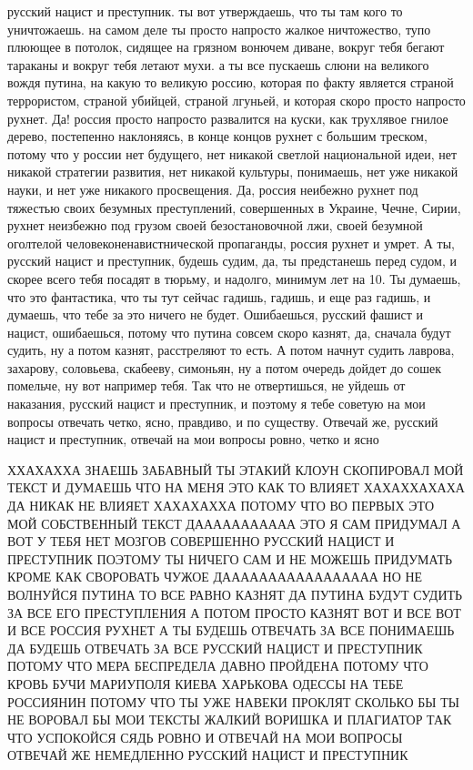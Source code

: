 русский нацист и преступник. ты вот утверждаешь, что ты там кого то
уничтожаешь.  на самом деле ты просто напросто жалкое ничтожество, тупо плюющее
в потолок, сидящее на грязном вонючем диване, вокруг тебя бегают тараканы и
вокруг тебя летают мухи.  а ты все пускаешь слюни на великого вождя путина, на
какую то великую россию, которая по факту является страной террористом, страной
убийцей, страной лгуньей, и которая скоро просто напросто рухнет. Да! россия
просто напросто развалится на куски, как трухлявое гнилое дерево, постепенно
наклоняясь, в конце концов рухнет с большим треском, потому что у россии нет
будущего, нет никакой светлой национальной идеи, нет никакой стратегии
развития, нет никакой культуры, понимаешь, нет уже никакой науки, и нет уже
никакого просвещения. Да, россия неибежно рухнет под тяжестью своих безумных
преступлений, совершенных в Украине, Чечне, Сирии, рухнет неизбежно под грузом
своей безостановочной лжи, своей безумной оголтелой человеконенавистнической
пропаганды, россия рухнет и умрет. А ты, русский нацист и преступник, будешь
судим, да, ты предстанешь перед судом, и скорее всего тебя посадят в тюрьму, и
надолго, минимум лет на 10. Ты думаешь, что это фантастика, что ты тут сейчас
гадишь, гадишь, и еще раз гадишь, и думаешь, что тебе за это ничего не будет.
Ошибаешься, русский фашист и нацист, ошибаешься, потому что путина совсем скоро
казнят, да, сначала будут судить, ну а потом казнят, расстреляют то есть. А
потом начнут судить лаврова, захарову, соловьева, скабееву, симоньян, ну а
потом очередь дойдет до сошек помельче, ну вот например тебя. Так что не
отвертишься, не уйдешь от наказания, русский нацист и преступник, и поэтому я
тебе советую на мои вопросы отвечать четко, ясно, правдиво, и по существу.
Отвечай же, русский нацист и преступник, отвечай на мои вопросы ровно, четко и
ясно

ХХАХАХХА ЗНАЕШЬ ЗАБАВНЫЙ ТЫ ЭТАКИЙ КЛОУН СКОПИРОВАЛ МОЙ ТЕКСТ И ДУМАЕШЬ ЧТО НА
МЕНЯ ЭТО КАК ТО ВЛИЯЕТ ХАХАХХАХАХА ДА НИКАК НЕ ВЛИЯЕТ ХАХАХАХХА ПОТОМУ ЧТО ВО
ПЕРВЫХ ЭТО МОЙ СОБСТВЕННЫЙ ТЕКСТ ДААААААААААА ЭТО Я САМ ПРИДУМАЛ А ВОТ У ТЕБЯ
НЕТ МОЗГОВ СОВЕРШЕННО РУССКИЙ НАЦИСТ И ПРЕСТУПНИК ПОЭТОМУ ТЫ НИЧЕГО САМ И НЕ
МОЖЕШЬ ПРИДУМАТЬ КРОМЕ КАК СВОРОВАТЬ ЧУЖОЕ ДААААААААААААААААА НО НЕ ВОЛНУЙСЯ
ПУТИНА ТО ВСЕ РАВНО КАЗНЯТ ДА ПУТИНА БУДУТ СУДИТЬ ЗА ВСЕ ЕГО ПРЕСТУПЛЕНИЯ А
ПОТОМ ПРОСТО КАЗНЯТ ВОТ И ВСЕ ВОТ И ВСЕ РОССИЯ РУХНЕТ А ТЫ БУДЕШЬ ОТВЕЧАТЬ ЗА
ВСЕ ПОНИМАЕШЬ ДА БУДЕШЬ ОТВЕЧАТЬ ЗА ВСЕ РУССКИЙ НАЦИСТ И ПРЕСТУПНИК ПОТОМУ ЧТО
МЕРА БЕСПРЕДЕЛА ДАВНО ПРОЙДЕНА ПОТОМУ ЧТО КРОВЬ БУЧИ МАРИУПОЛЯ КИЕВА ХАРЬКОВА
ОДЕССЫ НА ТЕБЕ РОССИЯНИН ПОТОМУ ЧТО ТЫ УЖЕ НАВЕКИ ПРОКЛЯТ СКОЛЬКО БЫ ТЫ НЕ
ВОРОВАЛ БЫ МОИ ТЕКСТЫ ЖАЛКИЙ ВОРИШКА И ПЛАГИАТОР ТАК ЧТО УСПОКОЙСЯ СЯДЬ РОВНО И
ОТВЕЧАЙ НА МОИ ВОПРОСЫ ОТВЕЧАЙ ЖЕ НЕМЕДЛЕННО РУССКИЙ НАЦИСТ И ПРЕСТУПНИК

